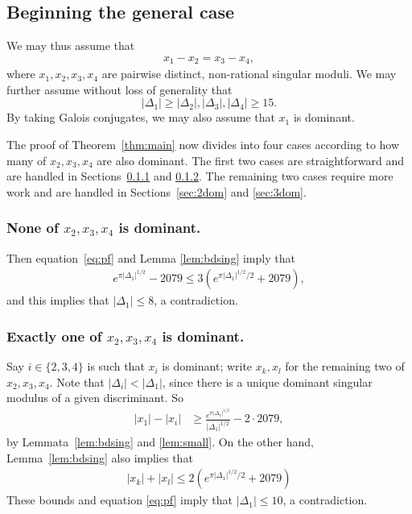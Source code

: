 \documentclass[12pt,a4paper,oneside]{amsart}
\begin{document}
\subsection{Beginning the general case}\label{subsec:general}

We may thus assume that
\begin{align}\label{eq:pf}
x_1 - x_2 = x_3 - x_4,
\end{align}
where $x_1, x_2, x_3, x_4$ are pairwise distinct, non-rational singular moduli.	We may further assume without loss of generality that
	\[ \lvert \Delta_1 \rvert \geq \lvert \Delta_2 \rvert, \lvert \Delta_3 \rvert, \lvert \Delta_4 \rvert \geq 15.\] 
	By taking Galois conjugates, we may also assume that $x_1$ is dominant. 
	
	The proof of Theorem~\ref{thm:main} now divides into four cases according to how many of $x_2, x_3, x_4$ are also dominant. The first two cases are straightforward and are handled in Sections~\ref{subsec:0dom} and \ref{subsec:1dom}. The remaining two cases require more work and are handled in Sections~\ref{sec:2dom} and \ref{sec:3dom}.
	
	
	
	\subsubsection{None of $x_2,x_3,x_4$ is dominant.}\label{subsec:0dom}
	 Then equation~\eqref{eq:pf} and Lemma \ref{lem:bdsing} imply that
	\begin{align*} 
		e^{\pi \lvert \Delta_1 \rvert^{1/2}}-2079 \leq 3(e^{\pi \lvert \Delta_1 \rvert^{1/2}/2} + 2079),
		 \end{align*}
	and this implies that $\lvert \Delta_1 \rvert \leq 8$, a contradiction.
	
	\subsubsection{Exactly one of $x_2,x_3,x_4$ is dominant.}\label{subsec:1dom}
	
	Say $i \in \{2, 3, 4\}$ is such that $x_i$ is dominant; write $x_k, x_l$ for the remaining two of $x_2, x_3, x_4$. Note that $\lvert \Delta_i \rvert < \lvert \Delta_1 \rvert$, since there is a unique dominant singular modulus of a given discriminant. So
	\begin{align*}
		\lvert x_1 \rvert - \lvert x_i \rvert &\geq  \frac{e^{\pi \lvert \Delta_1 \rvert^{1/2}}}{\lvert \Delta_1 \rvert^{1/2}}  - 2 \cdot 2079,
	\end{align*}
	by Lemmata~\ref{lem:bdsing} and \ref{lem:small}.	On the other hand, Lemma~\ref{lem:bdsing} also implies that
	\begin{align*}
		\lvert x_k \rvert + \lvert x_l \rvert \leq 2 (e^{\pi \lvert \Delta_1 \rvert^{1/2}/2} + 2079)
	\end{align*}
These bounds and equation \eqref{eq:pf} imply that $\lvert \Delta_1 \rvert \leq 10$, a contradiction.
\end{document}
